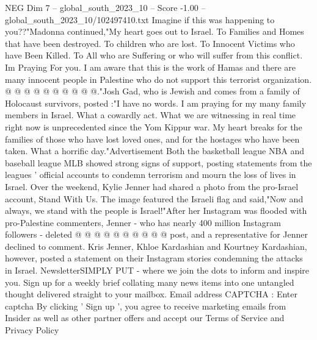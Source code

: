 \begin{textsample}{NEG Dim 7 – global\_south\_2023\_10 – Score -1.00 – global\_south\_2023\_10/102497410.txt}
Imagine if this was happening to you??"Madonna continued,"My heart goes out to Israel.
To Families and Homes that have been destroyed.
To children who are lost.
To Innocent Victims who have Been Killed.
To All who are Suffering or who will suffer from this conflict.
Im Praying For you.
I am aware that this is the work of Hamas and there are many innocent people in Palestine who do not support this terrorist organization. @ @ @ @ @ @ @ @ @ @."Josh Gad, who is Jewish and comes from a family of Holocaust survivors, posted :"I have no words.
I am praying for my many family members in Israel.
What a cowardly act.
What we are witnessing in real time right now is unprecedented since the Yom Kippur war.
My heart breaks for the families of those who have lost loved ones, and for the hostages who have been taken.
What a horrific day."Advertisement Both the basketball league NBA and baseball league MLB showed strong signs of support, posting statements from the leagues ' official accounts to condemn terrorism and mourn the loss of lives in Israel.
Over the weekend, Kylie Jenner had shared a photo from the pro-Israel account, Stand With Us.
The image featured the Israeli flag and said,"Now and always, we stand with the people is Israel!"After her Instagram was flooded with pro-Palestine commenters, Jenner - who has nearly 400 million Instagram followers - deleted @ @ @ @ @ @ @ @ @ @ post, and a representative for Jenner declined to comment.
Kris Jenner, Khloe Kardashian and Kourtney Kardashian, however, posted a statement on their Instagram stories condemning the attacks in Israel.
NewsletterSIMPLY PUT - where we join the dots to inform and inspire you.
Sign up for a weekly brief collating many news items into one untangled thought delivered straight to your mailbox.
Email address CAPTCHA : Enter captcha By clicking ' Sign up ', you agree to receive marketing emails from Insider as well as other partner offers and accept our Terms of Service and Privacy Policy

\end{textsample}
